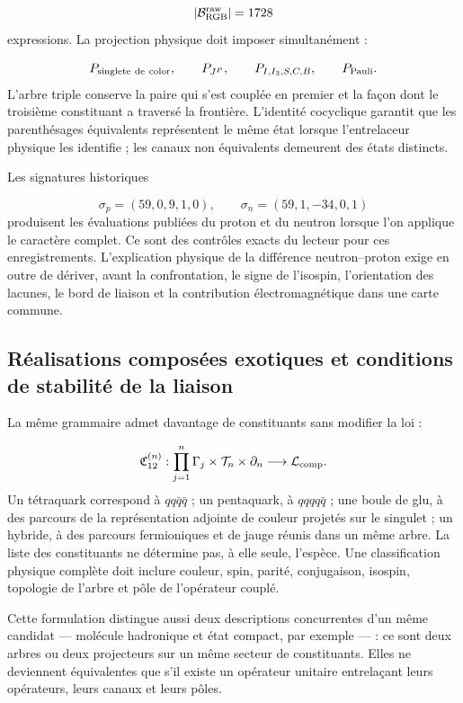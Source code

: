 \[
\lvert\mathcal B_{\rm RGB}^{\rm raw}\rvert=1728
\]
expressions. La projection physique doit imposer simultanément :

\[
P_{\rm singlete\ de\ color},
\qquad
P_{J^P},
\qquad
P_{I,I_3,S,C,B},
\qquad
P_{\rm Pauli}.
\]
L'arbre triple conserve la paire qui s'est couplée en premier et la façon dont le troisième constituant a traversé la frontière. L'identité cocyclique garantit que les parenthésages équivalents représentent le même état lorsque l'entrelaceur physique les identifie ; les canaux non équivalents demeurent des états distincts.

Les signatures historiques

\[
\sigma_p=(59,0,9,1,0),
\qquad
\sigma_n=(59,1,-34,0,1)
\]
produisent les évaluations publiées du proton et du neutron lorsque l'on applique le caractère complet. Ce sont des contrôles exacts du lecteur pour ces enregistrements. L'explication physique de la différence neutron--proton exige en outre de dériver, avant la confrontation, le signe de l'isospin, l'orientation des lacunes, le bord de liaison et la contribution électromagnétique dans une carte commune.

\subsection{Réalisations composées exotiques et conditions de stabilité de la liaison}
La même grammaire admet davantage de constituants sans modifier la loi :

\[
\mathfrak C_{12}^{(n)}:
\prod_{j=1}^{n}\Gamma_j\times\mathcal T_n\times\partial_n
\longrightarrow\mathcal L_{\rm comp}.
\]
Un tétraquark correspond à \(qq\bar q\bar q\) ; un pentaquark, à \(qqqq\bar q\) ; une boule de glu, à des parcours de la représentation adjointe de couleur projetés sur le singulet ; un hybride, à des parcours fermioniques et de jauge réunis dans un même arbre. La liste des constituants ne détermine pas, à elle seule, l'espèce. Une classification physique complète doit inclure couleur, spin, parité, conjugaison, isospin, topologie de l'arbre et pôle de l'opérateur couplé.

Cette formulation distingue aussi deux descriptions concurrentes d'un même candidat --- molécule hadronique et état compact, par exemple --- : ce sont deux arbres ou deux projecteurs sur un même secteur de constituants. Elles ne deviennent équivalentes que s'il existe un opérateur unitaire entrelaçant leurs opérateurs, leurs canaux et leurs pôles.


